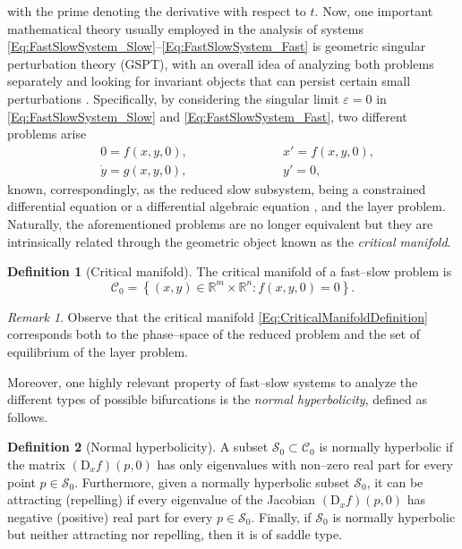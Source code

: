 \documentclass[3p]{elsarticle}
\theoremstyle{plain}
\theoremstyle{remark}
\newtheorem{remark}{Remark}
\theoremstyle{definition}
\newtheorem{definition}{Definition}[section]
\begin{document}
        with the prime denoting the derivative with respect to $t$. Now, one important mathematical theory usually employed in the analysis of systems \eqref{Eq:FastSlowSystem_Slow}--\eqref{Eq:FastSlowSystem_Fast} is geometric singular perturbation theory (GSPT), with an overall idea of analyzing both problems separately and looking for invariant objects that can persist certain small perturbations \cite{Ref:Kuehn2015}. Specifically, by considering the singular limit $\varepsilon = 0$ in \eqref{Eq:FastSlowSystem_Slow} and 
        \eqref{Eq:FastSlowSystem_Fast}, two different problems arise
        \begin{equation}
            \begin{aligned}
            & 0=f(x,y,0), \qquad \qquad \qquad && x'=f(x,y,0),\\
            & \dot{y} = g(x,y,0), \qquad \qquad \qquad && y'=0,
            \label{Eq:SingularLimits}
            \end{aligned}
        \end{equation}
        known, correspondingly, as the reduced slow subsystem, being a constrained differential equation \cite{Ref:Takens1976} or a differential algebraic equation \cite{Ref:Kunkel2006}, and the layer problem. Naturally, the aforementioned problems are no longer equivalent but they are intrinsically related through the geometric object known as the \emph{critical manifold}.
        \begin{definition}[Critical manifold]
            The critical manifold of a fast--slow problem is
            \begin{equation}
                \mathcal{C}_{0} = \left\{ (x,y)\in\mathbb{R}^{m}\times \mathbb{R}^{n} : f(x,y,0) = 0 \right\}.
                \label{Eq:CriticalManifoldDefinition}
            \end{equation}
        \end{definition}

        \begin{remark}
            Observe that the critical manifold \eqref{Eq:CriticalManifoldDefinition} corresponds both to the phase--space of the reduced problem and the set of equilibrium of the layer problem.
        \end{remark}

        Moreover, one highly relevant property of fast--slow systems to analyze the different types of possible bifurcations is the \emph{normal hyperbolicity}, defined as follows.

        \begin{definition}[Normal hyperbolicity]\label{def:nh}
            A subset $\mathcal{S}_{0} \subset \mathcal{C}_{0}$ is normally hyperbolic if the matrix $(\text{D}_{x}f)(p,0)$ has only eigenvalues with non--zero real part for every point $p\in \mathcal{S}_{0}$. Furthermore, given a normally hyperbolic subset $\mathcal{S}_{0}$, it can be attracting (repelling) if every eigenvalue of the Jacobian $(\text{D}_{x}f)(p,0)$ has negative (positive) real part for every $p\in\mathcal{S}_{0}$. Finally, if $\mathcal{S}_{0}$ is normally hyperbolic but neither attracting nor repelling, then it is of saddle type.
        \end{definition}
\end{document}
